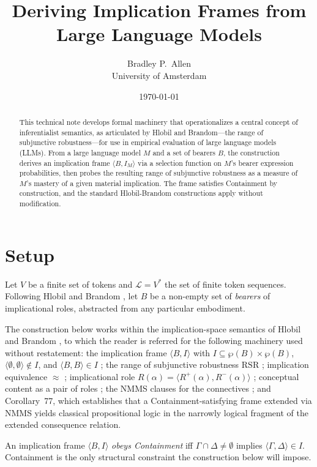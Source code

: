 \documentclass[11pt]{article}
\title{Deriving Implication Frames from Large Language Models}
\author{Bradley P.\ Allen\\University of Amsterdam}
\date{\today}
\begin{document}
\maketitle

\begin{abstract}
This technical note develops formal machinery that operationalizes a central concept of inferentialist semantics, as articulated by Hlobil and Brandom---the range of subjunctive robustness---for use in empirical evaluation of large language models (LLMs). From a large language model $M$ and a set of bearers $B$, the construction derives an implication frame $\langle B, I_M \rangle$ via a selection function on $M$'s bearer expression probabilities, then probes the resulting range of subjunctive robustness as a measure of $M$'s mastery of a given material implication. The frame satisfies Containment by construction, and the standard Hlobil-Brandom constructions apply without modification.
\end{abstract}

\section{Setup}

Let $V$ be a finite set of tokens and $\mathcal{L} = V^*$ the set of finite token sequences. Following Hlobil and Brandom \cite[Def.~61]{hlobil2025}, let $B$ be a non-empty set of \emph{bearers} of implicational roles, abstracted from any particular embodiment. 

The construction below works within the implication-space semantics of Hlobil and Brandom \cite{hlobil2025}, to which the reader is referred for the following machinery used without restatement: the implication frame $\langle B, I \rangle$ with $I \subseteq \wp(B) \times \wp(B)$, $\langle \emptyset, \emptyset \rangle \notin I$, and $\langle B, B \rangle \in I$ \cite[Def.~62]{hlobil2025}; the range of subjunctive robustness $\mathrm{RSR}$ \cite[Def.~63]{hlobil2025}; implication equivalence $\approx$ \cite[Def.~64]{hlobil2025}; implicational role $R(\alpha) = \langle R^+(\alpha), R^-(\alpha) \rangle$ \cite[Def.~65]{hlobil2025}; conceptual content as a pair of roles \cite[Def.~66]{hlobil2025}; the NMMS clauses for the connectives \cite[Def.~70]{hlobil2025}; and Corollary~77, which establishes that a Containment-satisfying frame extended via NMMS yields classical propositional logic in the narrowly logical fragment of the extended consequence relation.

An implication frame $\langle B, I \rangle$ \emph{obeys Containment} iff $\Gamma \cap \Delta \neq \emptyset$ implies $\langle \Gamma, \Delta \rangle \in I$. Containment is the only structural constraint the construction below will impose.
\end{document}
